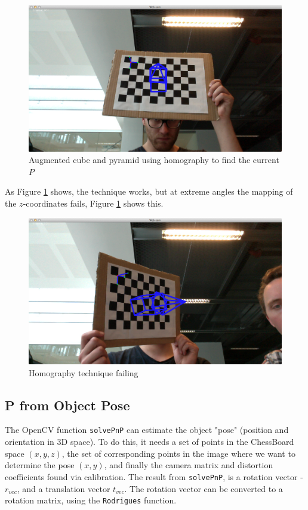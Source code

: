 \documentclass[a4paper,11pt]{article}
\begin{document}
\begin{figure}[H]
\begin{centering}
\includegraphics[width=0.8\linewidth]{cube_from_homography}
\caption{Augmented cube and pyramid using homography to find the current $P$}
\label{fig:cube_from_homography}
\end{centering}
\end{figure}

As Figure \ref{fig:cube_from_homography} shows, the technique works, but at extreme angles the mapping of the $z$-coordinates fails, Figure \ref{fig:cube_from_homography} shows this.\\


\begin{figure}[H]
\centering
\includegraphics[width=0.8\linewidth]{cube_from_homography_fail}
\caption{Homography technique failing}
\label{fig:cube_from_homography_fail}
\end{figure}
\subsection{P from Object Pose}
The OpenCV function \texttt{solvePnP} can estimate the object "pose" (position and orientation in 3D space). To do this, it needs a set of points in the ChessBoard space $(x, y, z)$, the set of corresponding points in the image where we want to determine the pose $(x, y)$, and finally the camera matrix and distortion coefficients found via calibration. The result from \texttt{solvePnP}, is a rotation vector - $r_{vec}$, and a translation vector $t_{vec}$. The rotation vector can be converted to a rotation matrix, using the \texttt{Rodrigues} function.
\end{document}
